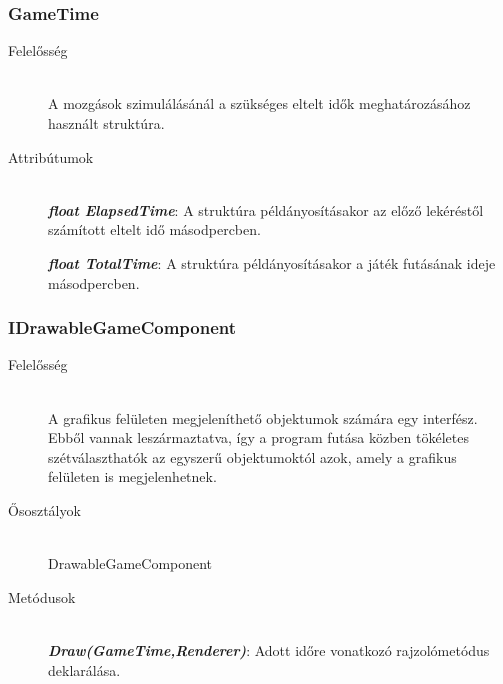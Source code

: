 \subsubsection{GameTime}
	\begin{description}
		\item[Felelősség] \hfill \\
		A mozgások szimulálásánál a szükséges eltelt idők meghatározásához használt struktúra.
		
		\item[Attribútumok]\hfill \\
		\textbf{\emph{float ElapsedTime}}: A struktúra példányosításakor az előző lekéréstől számított eltelt idő másodpercben.

		\textbf{\emph{float TotalTime}}: A struktúra példányosításakor a játék futásának ideje másodpercben.
	\end{description}
	
\subsubsection{IDrawableGameComponent}
	\begin{description}
		\item[Felelősség] \hfill \\
		A grafikus felületen megjeleníthető	objektumok számára egy interfész. Ebből vannak leszármaztatva, így a program futása közben tökéletes szétválaszthatók az egyszerű objektumoktól azok, amely a grafikus felületen is megjelenhetnek.

		\item[Ősosztályok] \hfill \\
		DrawableGameComponent

		\item[Metódusok]\hfill \\
		\textbf{\emph{Draw(GameTime,Renderer)}}: Adott időre vonatkozó rajzolómetódus deklarálása. 
	\end{description}

